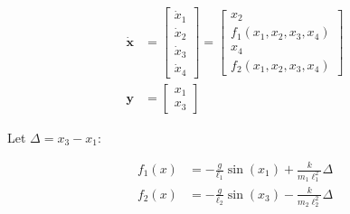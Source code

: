 \documentclass[border=0pt]{standalone}
\begin{document}
\noindent
\begin{minipage}{7cm}
  \begin{align*}
    \dot{\mathbf{x}} &=
    \begin{bmatrix}
      \dot{x}_1 \\
      \dot{x}_2 \\
      \dot{x}_3 \\
      \dot{x}_4
    \end{bmatrix}
    =
    \begin{bmatrix}
      x_2 \\
      f_1(x_1, x_2, x_3, x_4) \\
      x_4 \\
      f_2(x_1, x_2, x_3, x_4)
    \end{bmatrix} \\
    \mathbf{y} &=
    \begin{bmatrix}
      x_1 \\
      x_3
    \end{bmatrix}
  \end{align*}

Let $\Delta = x_3 - x_1$:

\begin{align*}
f_1(x) &= -\frac{g}{\ell_1} \sin(x_1) + \frac{k}{m_1 \ell_1^2} \Delta \\
f_2(x) &= -\frac{g}{\ell_2} \sin(x_3) - \frac{k}{m_2 \ell_2^2} \Delta
\end{align*}
\end{minipage}
\end{document}
